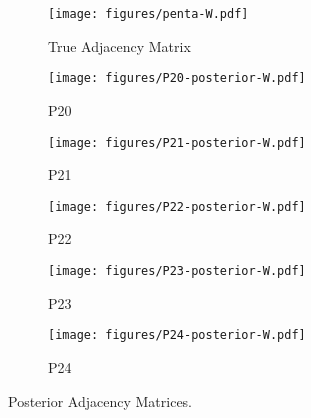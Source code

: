 \begin{figure}[t]
	\centering
	\begin{subfigure}{0.31\textwidth}
		\centering
		\texttt{[image: figures/penta-W.pdf]}
		\caption{True Adjacency Matrix}
	\end{subfigure}
	\begin{subfigure}{0.31\textwidth}
		\centering
		\texttt{[image: figures/P20-posterior-W.pdf]}
		\caption{P20}
	\end{subfigure}
	\begin{subfigure}{0.31\textwidth}
		\centering
		\texttt{[image: figures/P21-posterior-W.pdf]}
		\caption{P21}
	\end{subfigure}
	\begin{subfigure}{0.31\textwidth}
		\centering
		\texttt{[image: figures/P22-posterior-W.pdf]}
		\caption{P22}
	\end{subfigure}
	\begin{subfigure}{0.31\textwidth}
		\centering
		\texttt{[image: figures/P23-posterior-W.pdf]}
		\caption{P23}
	\end{subfigure}
	\begin{subfigure}{0.31\textwidth}
		\centering
		\texttt{[image: figures/P24-posterior-W.pdf]}
		\caption{P24}
	\end{subfigure}
	\caption{Posterior Adjacency Matrices.}
	\label{fig:P2}
\end{figure}
